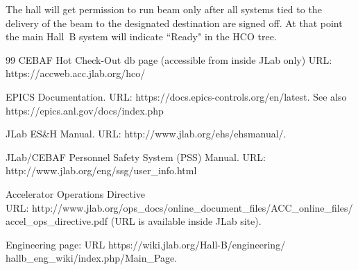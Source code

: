 \documentclass[12pt]{report}
\begin{document}
The hall will get permission to run beam only after all systems tied to the delivery of the 
beam to the designated destination are signed off. At that point the main Hall~B system will 
indicate ``Ready" in the HCO tree.
















%

%

%

%

%

%

%

%

%

%

%

%

%





\begin{thebibliography}{99}
 CEBAF Hot Check-Out db page (accessible from inside JLab only)
URL: https://accweb.acc.jlab.org/hco/

EPICS Documentation. URL: https://docs.epics-controls.org/en/latest.
See also https://epics.anl.gov/docs/index.php

JLab ES\&H Manual. URL: http://www.jlab.org/ehs/ehsmanual/.

JLab/CEBAF Personnel Safety System (PSS) Manual. URL: http://www.jlab.org/eng/ssg/user\_info.html

Accelerator Operations Directive \\
URL: http://www.jlab.org/ops\_docs/online\_document\_files/ACC\_online\_files/\\accel\_ops\_directive.pdf (URL is available inside JLab site).

Engineering page: URL https://wiki.jlab.org/Hall-B/engineering/\\hallb\_eng\_wiki/index.php/Main\_Page.

\end{thebibliography}
\end{document}

